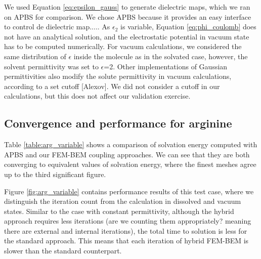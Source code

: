 We used Equation \eqref{eq:epsilon_gauss} to generate dielectric maps, which we ran on APBS for comparison. 
We chose APBS because it provides an easy interface to control de dielectric map.....
As $\epsilon_2$ is variable, Equation \eqref{eq:phi_coulomb} does not have an analytical solution, and the electrostatic potential in vacuum state has to be computed numerically.
For vacuum calculations, we considered the same distribution of $\epsilon$ inside the molecule as in the solvated case, however, the solvent permittivity was set to $\epsilon$=2. 
Other implementations of Gaussian permittivities also modify the solute permittivity in vacuum calculations, according to a set cutoff [Alexov]. 
We did not consider a cutoff in our calculations, but this does not affect our validation exercise. 

\subsection*{\sffamily \large Convergence and performance for arginine}

Table \ref{table:arg_variable} shows a comparison of solvation energy computed with APBS and our FEM-BEM coupling approaches. We can see that they are both converging to equivalent values of solvation energy, where the finest meshes agree up to the third significant figure.

Figure \ref{fig:arg_variable} contains performance results of this test case, where we distinguish the iteration count from the calculation in dissolved and vacuum states. 
Similar to the case with constant permittivity, although the hybrid approach requires less iterations (are we counting them appropriately? meaning there are external and internal iterations), the total time to solution is less for the standard approach. This means that each iteration of hybrid FEM-BEM is slower than the standard counterpart.


